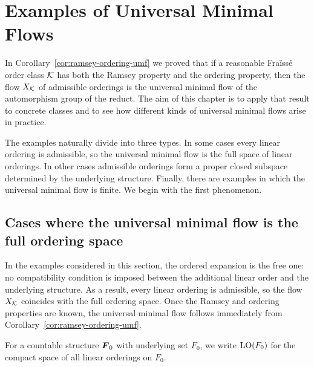 \chapter{Examples of Universal Minimal Flows}
\label{chap:examples-umf}

In Corollary~\ref{cor:ramsey-ordering-umf} we proved that if a reasonable Fraïssé order class \(\mathcal{K}\) has both the Ramsey property and the ordering property, then the flow \(X_{\mathcal{K}}\) of admissible orderings is the universal minimal flow of the automorphism group of the reduct. The aim of this chapter is to apply that result to concrete classes and to see how different kinds of universal minimal flows arise in practice.

The examples naturally divide into three types. In some cases every linear ordering is admissible, so the universal minimal flow is the full space of linear orderings. In other cases admissible orderings form a proper closed subspace determined by the underlying structure. Finally, there are examples in which the universal minimal flow is finite. We begin with the first phenomenon.

\section{Cases where the universal minimal flow is the full ordering space}

In the examples considered in this section, the ordered expansion is the free one: no compatibility condition is imposed between the additional linear order and the underlying structure. As a result, every linear ordering is admissible, so the flow \(X_{\mathcal{K}}\) coincides with the full ordering space. Once the Ramsey and ordering properties are known, the universal minimal flow follows immediately from Corollary~\ref{cor:ramsey-ordering-umf}.

For a countable structure \(\boldsymbol{F}_0\) with underlying set \(F_0\), we write
\(\operatorname{LO}(F_0)\) for the compact space of all linear orderings on \(F_0\).


